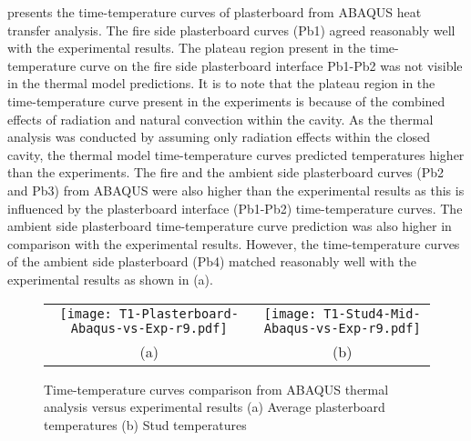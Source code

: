  presents the time-temperature curves of plasterboard from ABAQUS heat transfer analysis. The fire side plasterboard curves (Pb1) agreed reasonably well with the experimental results. The plateau region present in the time-temperature curve on the fire side plasterboard interface Pb1-Pb2 was not visible in the thermal model predictions. It is to note that the plateau region in the time-temperature curve present in the experiments is because of the combined effects of radiation and natural convection within the cavity. As the thermal analysis was conducted by assuming only radiation effects within the closed cavity, the thermal model time-temperature curves predicted temperatures higher than the experiments. The fire and the ambient side plasterboard curves (Pb2 and Pb3) from ABAQUS were also higher than the experimental results as this is influenced by the plasterboard interface (Pb1-Pb2) time-temperature curves. The ambient side plasterboard time-temperature curve prediction was also higher in comparison with the experimental results. However, the time-temperature curves of the ambient side plasterboard (Pb4) matched reasonably well with the experimental results as shown in  (a).
\begin{figure}[!htbp]
	\centering
		\begin{tabular}{cc}
			\texttt{[image: T1-Plasterboard-Abaqus-vs-Exp-r9.pdf]} & \texttt{[image: T1-Stud4-Mid-Abaqus-vs-Exp-r9.pdf]} \\
			(a) & (b) \\
		\end{tabular} 
		\caption{Time-temperature curves comparison from ABAQUS thermal analysis versus experimental results (a) Average plasterboard temperatures (b) Stud temperatures}
		\label{fig:abaqus-output-pb-studs}
\end{figure}

